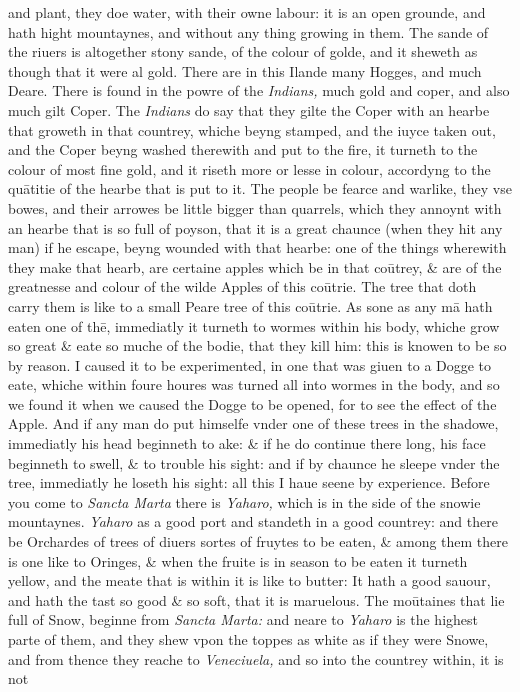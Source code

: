 \documentclass[11pt,twoside]{article}\makeatletter
\begin{document}
       and plant, they doe water, with their owne labour: it is an o­pen grounde, and hath hight mountaynes, and without any thing growing in them. The sande of the riuers is altogether stony sande, of the colour of golde, and it sheweth as though that it were al gold. There are in this Ilande many Hogges, and much Deare. There is found in the powre of the {\itshape Indians,} much gold and coper, and also much gilt Coper. The {\itshape Indians} do say that they gilte the Coper with an hearbe that grow­eth in that countrey, whiche beyng stamped, and the iuyce ta­ken out, and the Coper beyng washed therewith and put to the fire, it turneth to the colour of most fine gold, and it riseth more or lesse in colour, accordyng to the quātitie of the hearbe that is put to it. The people be fearce and warlike, they vse bowes, and their arrowes be little bigger than quarrels, which they annoynt with an hearbe that is so full of poyson, that it is a great chaunce (when they hit any man) if he escape, beyng wounded with that hearbe: one of the things wherewith they make that hearb, are certaine apples which be in that coūtrey, 
	\normalmarginpar
       \& are of the greatnesse and colour of the wilde Apples of this coūtrie. The tree that doth carry them is like to a small Peare tree of this coūtrie. As sone as any mā hath eaten one of thē, immediatly it turneth to wormes within his body, whiche grow so great \& eate so muche of the bodie, that they kill him: this is knowen to be so by reason. I caused it to be experimen­ted, in one that was giuen to a Dogge to eate, whiche within foure houres was turned all into wormes in the body, and so we found it when we caused the Dogge to be opened, for to %
 see the effect of the Apple. And if any man do put himselfe vn­der one of these trees in the shadowe, immediatly his head be­ginneth to ake: \& if he do continue there long, his face begin­neth to swell, \& to trouble his sight: and if by chaunce he sleepe vnder the tree, immediatly he loseth his sight: all this I haue seene by experience. Before you come to {\itshape Sancta Marta} there is {\itshape Yaharo,} which is in the side of the snowie mountaynes. {\itshape Ya­haro} as a good port and standeth in a good countrey: and there 
	\normalmarginpar
       be Orchardes of trees of diuers sortes of fruytes to be eaten, \& among them there is one like to Oringes, \& when the fruite is in season to be eaten it turneth yellow, and the meate that is within it is like to butter: It hath a good sauour, and hath the tast so good \& so soft, that it is maruelous. The moūtaines that lie full of Snow, beginne from {\itshape Sancta Marta:} and neare to {\itshape Yaharo} is the highest parte of them, and they shew vpon the toppes as white as if they were Snowe, and from thence they reache to {\itshape Veneciuela,} and so into the countrey within, it is not 
\end{document}
